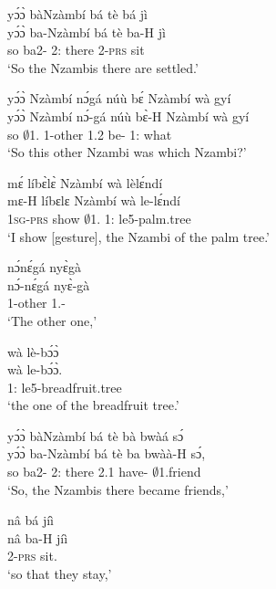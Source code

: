 \begin{exe}[(N234)]
\exN\label{n13} 
  \glll  yɔ́ɔ̀ bàNzàmbí bá tè bá jì  \\
         yɔ́ɔ̀ ba-Nzàmbí bá tè ba-H jì \\
           so ba2-{\PN} 2:{\ATT}  there 2-\textsc{prs} sit   \\
    \trans `So the Nzambis there are settled.'
 
\exN\label{n14}
  \glll  yɔ́ɔ̀ Nzàmbí nɔ́gá núù bɛ́ Nzàmbí wà gyí \\
        yɔ́ɔ̀ Nzàmbí nɔ́-gá núù bɛ̀-H Nzàmbí wà gyí \\
          so $\emptyset$1.{\PN} 1-other 1.{\PST}2 be-{\R}  {\PN} 1:{\ATT}  what   \\
    \trans `So this other Nzambi was which Nzambi?'
 
\exN\label{n15}
  \glll  mɛ́ líbɛ̀lɛ̀ Nzàmbí  wà lèlɛ́ndí \\
         mɛ-H líbɛlɛ Nzàmbí  wà le-lɛ́ndí \\
           1\textsc{sg}-\textsc{prs} show $\emptyset$1.{\PN} 1:{\ATT}  le5-palm.tree  \\
    \trans `I show [gesture], the Nzambi of the palm tree.'

\exN\label{n16}
  \glll  nɔ́nɛ́gá nyɛ̀gà \\
        nɔ́-nɛ́gá nyɛ̀-gà\\
           1-other 1.{\SBJ}-{\CONTR} \\
    \trans `The other one,'
 
\exN\label{n17}
  \glll  wà lè-bɔ́ɔ̀ \\
        wà le-bɔ́ɔ̀. \\
           1:{\ATT}  le5-breadfruit.tree  \\
    \trans `the one of the breadfruit tree.'
 
\exN\label{n18}
  \glll  yɔ́ɔ̀ bàNzàmbí bá tè bà bwàá sɔ́ \\
         yɔ́ɔ̀ ba-Nzàmbí bá tè ba bwàà-H sɔ́, \\
            so ba2-{\PN} 2:{\ATT}  there 2.{\PST}1 have-{\R} $\emptyset$1.friend  \\
    \trans `So, the Nzambis there became friends,'
 
\exN\label{n19}
  \glll  nâ bá jíì \\
         nâ ba-H jíì \\
           {\COMP} 2-\textsc{prs} sit.{\SBJV}   \\
    \trans `so that they stay,'
 

\end{exe}
